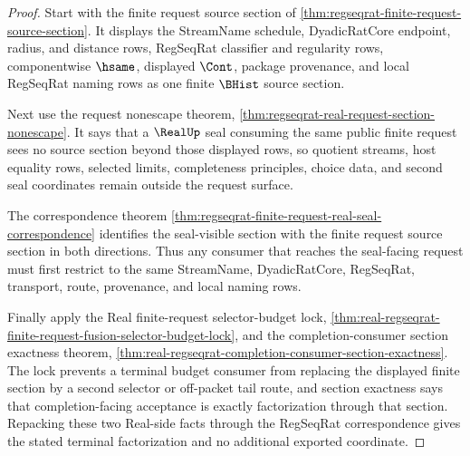 \begin{proof}
Start with the finite request source section of
\autoref{thm:regseqrat-finite-request-source-section}. It displays the
StreamName schedule, DyadicRatCore endpoint, radius, and distance rows,
RegSeqRat classifier and regularity rows, componentwise $\hsame$, displayed
$\Cont$, package provenance, and local RegSeqRat naming rows as one finite
$\BHist$ source section.

Next use the request nonescape theorem,
\autoref{thm:regseqrat-real-request-section-nonescape}. It says that a
$\RealUp$ seal consuming the same public finite request sees no source section
beyond those displayed rows, so quotient streams, host equality rows, selected
limits, completeness principles, choice data, and second seal coordinates
remain outside the request surface.

The correspondence theorem
\autoref{thm:regseqrat-finite-request-real-seal-correspondence} identifies
the seal-visible section with the finite request source section in both
directions. Thus any consumer that reaches the seal-facing request must first
restrict to the same StreamName, DyadicRatCore, RegSeqRat, transport, route,
provenance, and local naming rows.

Finally apply the Real finite-request selector-budget lock,
\autoref{thm:real-regseqrat-finite-request-fusion-selector-budget-lock}, and
the completion-consumer section exactness theorem,
\autoref{thm:real-regseqrat-completion-consumer-section-exactness}. The lock
prevents a terminal budget consumer from replacing the displayed finite
section by a second selector or off-packet tail route, and section exactness
says that completion-facing acceptance is exactly factorization through that
section. Repacking these two Real-side facts through the RegSeqRat
correspondence gives the stated terminal factorization and no additional
exported coordinate.
\end{proof}

